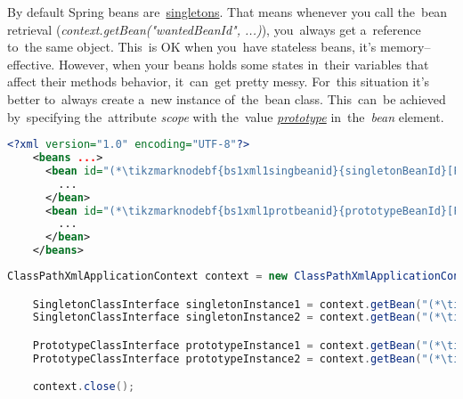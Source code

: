 \label{beanscope}
By default Spring beans are~\hyperref[singletondp]{singletons}. That means whenever you call the~bean retrieval (\textit{context.getBean("wantedBeanId", ...)}), you~always get a~reference to~the same object. This~is OK when you~have stateless beans, it's memory--effective. However, when your beans holds some states in~their variables that affect their methods behavior, it~can~get pretty messy. For~this situation it's better to~always create a~new instance of~the~bean class. This~can~be achieved by~specifying the~attribute \textit{scope} with the~value \hyperref[prototypedp]{\textit{prototype}} in~the~\textit{bean} element.

\example
\begin{lstlisting}[language=XML, title={Configuration XML}]
    <?xml version="1.0" encoding="UTF-8"?>
    <beans ...>
      <bean id="(*\tikzmarknodebf{bs1xml1singbeanid}{singletonBeanId}[ForestGreen]*)" class="somepackage.subpackage.SingletonClass">
        ...
      </bean>
      <bean id="(*\tikzmarknodebf{bs1xml1protbeanid}{prototypeBeanId}[ForestGreen]*)" class="somepackage.subpackage.PrototypeClass" scope="prototype">
        ...
      </bean>
    </beans>
\end{lstlisting}
\begin{lstlisting}[language=Java, title={Usage}]
    ClassPathXmlApplicationContext context = new ClassPathXmlApplicationContext("configurationFile.xml");

    SingletonClassInterface singletonInstance1 = context.getBean("(*\tikzmarknodebf{bs1java1singbeanid1}{singletonBeanId}[ForestGreen]*)", SingletonClassInterface.class);
    SingletonClassInterface singletonInstance2 = context.getBean("(*\tikzmarknodebf{bs1java1singbeanid2}{singletonBeanId}[ForestGreen]*)", SingletonClassInterface.class);

    PrototypeClassInterface prototypeInstance1 = context.getBean("(*\tikzmarknodebf{bs1java1protbeanid1}{prototypeBeanId}[ForestGreen]*)", PrototypeClassInterface.class);
    PrototypeClassInterface prototypeInstance2 = context.getBean("(*\tikzmarknodebf{bs1java1protbeanid2}{prototypeBeanId}[ForestGreen]*)", PrototypeClassInterface.class);

    context.close();
\end{lstlisting}

